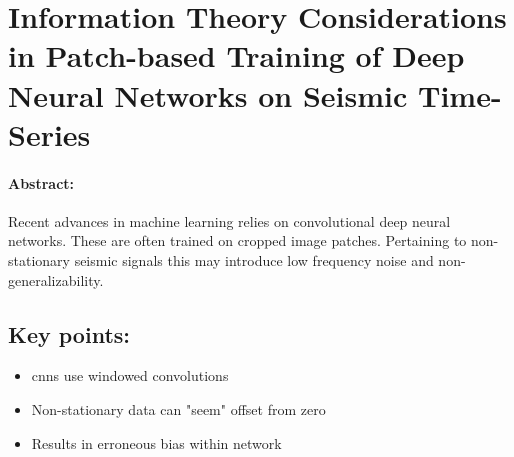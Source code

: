 \section{Information Theory Considerations in Patch-based Training of Deep Neural Networks on Seismic Time-Series}

\paragraph{Abstract:} Recent advances in machine learning relies on convolutional deep neural networks. These are often trained on cropped image patches. Pertaining to non-stationary seismic signals this may introduce low frequency noise and non-generalizability.
\vfill
\subsection*{Key points:}
\begin{itemize}
    \item \aclp{cnn} use windowed convolutions
    \item Non-stationary data can "seem" offset from zero
    \item Results in erroneous bias within network
\end{itemize}
\vfill
{\vfill\hfill\newline{}}



